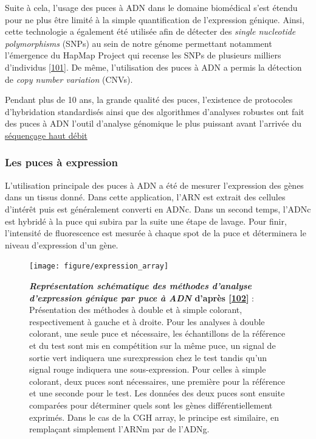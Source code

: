 \documentclass[12pt,a4paper,twoside]{ugathesis}
\theoremstyle{definition}
\theoremstyle{definition}
\theoremstyle{definition}
\theoremstyle{remark}
\begin{document}
Suite à cela, l'usage des puces à ADN dans le domaine biomédical s'est
étendu pour ne plus être limité à la simple quantification de
l'expression génique. Ainsi, cette technologie a également été utilisée
afin de détecter des \emph{single nucleotide polymorphisms} (SNPs) au
sein de notre génome permettant notamment l'émergence du HapMap Project
qui recense les SNPs de plusieurs milliers d'individus
{[}\protect\hyperlink{ref-Cutler2001}{101}{]}. De même, l'utilisation
des puces à ADN a permis la détection de \emph{copy number variation}
(CNVs).

Pendant plus de 10 ans, la grande qualité des puces, l'existence de
protocoles d'hybridation standardisés ainsi que des algorithmes
d'analyses robustes ont fait des puces à ADN l'outil d'analyse génomique
le plus puissant avant l'arrivée du \protect\hyperlink{ngs}{séquençage
haut débit}

\newpage

\subsubsection{Les puces à expression}\label{les-puces-a-expression}

L'utilisation principale des puces à ADN a été de mesurer l'expression
des gènes dans un tissus donné. Dans cette application, l'ARN est
extrait des cellules d'intérêt puis est généralement converti en ADNc.
Dans un second temps, l'ADNc est hybridé à la puce qui subira par la
suite une étape de lavage. Pour finir, l'intensité de fluorescence est
mesurée à chaque spot de la puce et déterminera le niveau d'expression
d'un gène.

\begin{figure}

{\centering \texttt{[image: figure/expression\_array]} 

}

\caption[Représentation schématique des méthodes d'analyse d'expression génique par puce à ADN]{\textbf{\emph{Représentation schématique des méthodes
d'analyse d'expression génique par puce à ADN} d'après
{[}\protect\hyperlink{ref-Trevino2007}{102}{]}} : Présentation des
méthodes à double et à simple colorant, respectivement à gauche et à
droite. Pour les analyses à double colorant, une seule puce et
nécessaire, les échantillons de la référence et du test sont mis en
compétition sur la même puce, un signal de sortie vert indiquera une
surexpression chez le test tandis qu'un signal rouge indiquera une
sous-expression. Pour celles à simple colorant, deux puces sont
nécessaires, une première pour la référence et une seconde pour le test.
Les données des deux puces sont ensuite comparées pour déterminer quels
sont les gènes différentiellement exprimés. Dans le cas de la CGH array,
le principe est similaire, en remplaçant simplement l'ARNm par de
l'ADNg.}\label{fig:pictexparray}
\end{figure}
\end{document}
